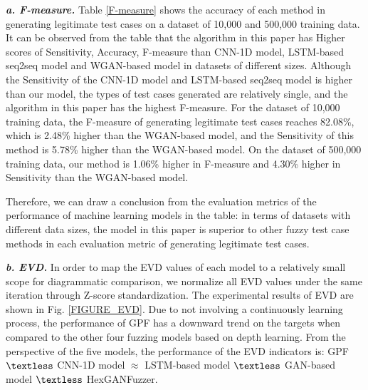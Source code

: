 \quad \textit{\textbf{a. F-measure.}} Table \ref{F-measure} shows the accuracy of each method in generating legitimate test cases on a dataset of 10,000 and 500,000 training data. It can be observed from the table that the algorithm in this paper has Higher scores of Sensitivity, Accuracy, F-measure than CNN-1D model, LSTM-based seq2seq model and WGAN-based model in datasets of different sizes. Although the Sensitivity of the CNN-1D model and LSTM-based seq2seq model is higher than our model, the types of test cases generated are relatively single, and the algorithm in this paper has the highest F-measure. For the dataset of 10,000 training data, the F-measure of generating legitimate test cases reaches 82.08\%, which is 2.48\% higher than the WGAN-based model, and the Sensitivity of this method is 5.78\% higher than the WGAN-based model. On the dataset of 500,000 training data, our method is 1.06\% higher in F-measure and 4.30\% higher in Sensitivity than the WGAN-based model. 

Therefore, we can draw a conclusion from the evaluation metrics of the performance of machine learning models in the table: in terms of datasets with different data sizes, the model in this paper is superior to other fuzzy test case methods in each evaluation metric of generating legitimate test cases.


\quad \textit{\textbf{b. EVD.}}
In order to map the EVD values of each model to a relatively small scope for diagrammatic comparison, we normalize all EVD values under the same iteration through Z-score standardization. The experimental results of EVD are shown in Fig. \ref{FIGURE_EVD}. Due to not involving a continuously learning process, the performance of GPF has a downward trend on the targets when compared to the other four fuzzing models based on depth learning. From the perspective of the five models, the performance of the EVD indicators is: GPF $\textless$ CNN-1D model $\approx$ LSTM-based model $\textless$ GAN-based model $\textless$ HexGANFuzzer. 

